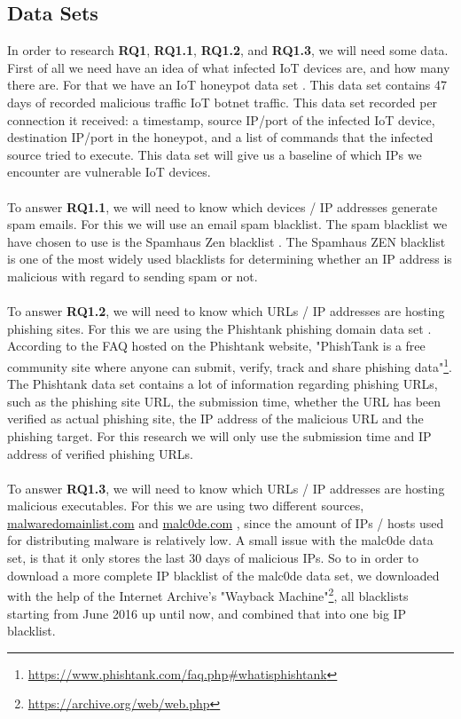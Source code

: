 \documentclass[a4paper,10pt]{article}
\begin{document}
\subsection{Data Sets} \label{sec:methodology:data}
In order to research \textbf{RQ1}, \textbf{RQ1.1}, \textbf{RQ1.2}, and \textbf{RQ1.3}, we will need some data.
First of all we need have an idea of what infected IoT devices are, and how many there are. For that we have
an IoT honeypot data set \cite{iot_honeypot_dataset}. This data set contains 47 days of recorded malicious traffic 
IoT botnet traffic. This data set recorded per connection it received: a timestamp, source IP/port of the infected IoT 
device, destination IP/port in the honeypot, and a list of commands that the infected source tried to execute. This 
data set will give us a baseline of which IPs we encounter are vulnerable IoT devices.
\\\\
To answer \textbf{RQ1.1}, we will need to know which devices / IP addresses generate spam emails. For this we
will use an email spam blacklist. The spam blacklist we have chosen to use is the Spamhaus Zen blacklist 
\cite{spamhaus_zen}. The Spamhaus ZEN blacklist is one of the most widely used blacklists for determining whether 
an IP address is malicious with regard to sending spam or not.
\\\\
To answer \textbf{RQ1.2}, we will need to know which URLs / IP addresses are hosting phishing sites. For this we
are using the Phishtank phishing domain data set \cite{phishtank}. According to the FAQ hosted on the Phishtank website,
"PhishTank is a free community site where anyone can submit, verify, track and share phishing data"\footnote{\url{https://www.phishtank.com/faq.php\#whatisphishtank}}. The Phishtank
data set contains a lot of information regarding phishing URLs, such as the phishing site URL, the submission time,
whether the URL has been verified as actual phishing site, the IP address of the malicious URL and the phishing target.
For this research we will only use the submission time and IP address of verified phishing URLs.
\\\\
To answer \textbf{RQ1.3}, we will need to know which URLs / IP addresses are hosting malicious executables. For 
this we are using two different sources, \url{malwaredomainlist.com} \cite{malwaredomainlist} and 
\url{malc0de.com} \cite{malc0de}, since the amount of IPs / hosts used for distributing malware is relatively
low. A small issue with the malc0de data set, is that it only stores the last 30 days of malicious IPs. So to in order to 
download a more complete IP blacklist of the malc0de data set, we downloaded with the help of the Internet Archive's
"Wayback Machine"\footnote{\url{https://archive.org/web/web.php}}, all blacklists starting from June 2016
up until now, and combined that into one big IP blacklist.
\end{document}
